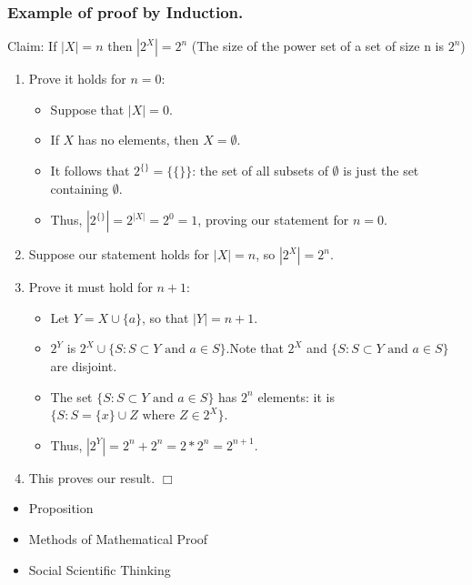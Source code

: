 \documentclass[aspectratio=169]{beamer}
\numberwithin{equation}{section}
\begin{document}
\begin{frame}
\frametitle{Example of proof by Induction.}

Claim:  If $|X|=n$ then $|2^X|=2^n$ (The size of the power set of a set of size n is $2^n$)\\
\begin{enumerate}
\item Prove it holds for $n=0$: 
\begin{itemize}
\item Suppose that $|X|=0$.  
\item If $X$ has no elements, then $X=\emptyset$. 
\item It follows that  $2^{\{\}}=\{\{\}\}$: the set of all subsets of $\emptyset$ is just the set containing $\emptyset$.  
\item Thus, $|2^{\{\}}|=2^{|X|}=2^0=1$, proving our statement for $n=0$.
\end{itemize}

\item Suppose our statement holds for $|X|=n$, so $|2^X|=2^n$.  

\item Prove it must hold for $n+1$: 
\begin{itemize}
\item Let $Y=X\cup \{a\}$, so that $|Y|=n+1$.  
\item $2^Y$ is $2^X\cup\{S: S\subset Y \text{ and } a\in S\}$.\pause   Note that $2^X$ and $\{S: S\subset Y \text{ and } a\in S\}$ are disjoint. \pause

\item The set $\{S: S\subset Y \text{ and } a\in S\}$ has $2^n$ elements: it is $\{S:  S=\{x\}\cup Z \text{ where } Z\in 2^X\}$.  \pause
\item Thus, $|2^Y| = 2^n+2^n=2*2^n=2^{n+1}$. \pause

\end{itemize}
\item This proves our result. $\Box$
\end{enumerate}
\end{frame}





\begin{frame}
\begin{itemize}
\item \textcolor{mygray}{Proposition}
\item \textcolor{mygray}{Methods of Mathematical Proof}
\item \textcolor{myblack}{Social Scientific Thinking}
\end{itemize}

\end{frame}
\end{document}

